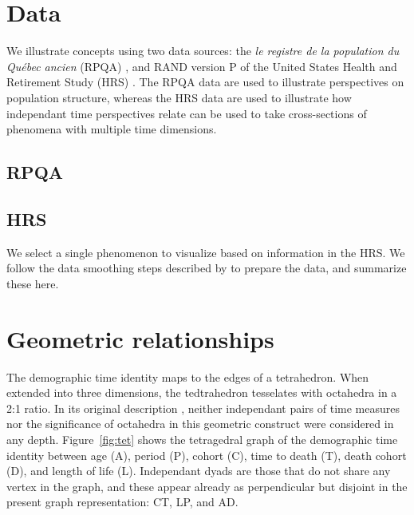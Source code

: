 \section{Data}
We illustrate concepts using two data sources: the \emph{le registre de la
population du Qu\'{e}bec ancien} (RPQA) \citep{desjardins1998}, and RAND version
P of the United States Health and Retirement Study (HRS) \citep{HRS, RAND}. The
RPQA data are used to illustrate perspectives on population structure,
whereas the HRS data are used to illustrate how independant time perspectives
relate can be used to take cross-sections of phenomena with multiple time
dimensions.

\subsection{RPQA}

\subsection{HRS} 
We select a single phenomenon to visualize based on information in the HRS. We
follow the data smoothing steps described by \citet{riffe2017hle} to prepare the
data, and summarize these here.

\section{Geometric relationships}
The demographic time identity maps to the edges of a tetrahedron. When extended
into three dimensions, the tedtrahedron tesselates with octahedra in a 2:1
ratio. In its original description \citep{riffe2017demographictime}, neither
independant pairs of time measures nor the significance of octahedra in this
geometric construct were considered in any depth. Figure~\ref{fig:tet}
shows the tetragedral graph of the demographic time identity between age
(A), period (P), cohort (C), time to death (T), death cohort (D), and length
of life (L). Independant dyads are those that do not share any vertex in the
graph, and these appear already as perpendicular but disjoint in the present
graph representation: CT, LP, and AD.

